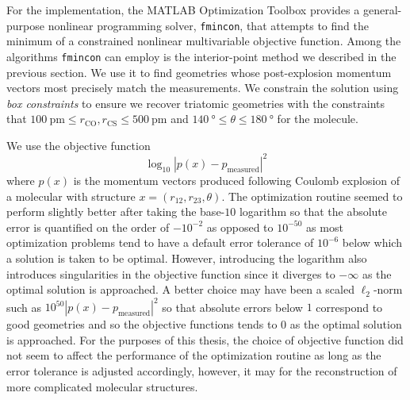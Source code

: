 For the implementation, the MATLAB Optimization Toolbox provides a general-purpose nonlinear programming solver, \texttt{fmincon}, that attempts to find the minimum of a constrained nonlinear multivariable objective function. Among the algorithms \texttt{fmincon} can employ is the interior-point method we described in the previous section. We use it to find geometries whose post-explosion momentum vectors most precisely match the measurements. We constrain the solution using \emph{box constraints} to ensure we recover triatomic geometries with the constraints that $\SI{100}{\pico\meter} \le r_\mathrm{CO}, r_\mathrm{CS} \le \SI{500}{\pico\meter}$ and $\SI{140}{\degree} \le \theta \le \SI{180}{\degree}$ for the  molecule.

We use the objective function
\begin{equation}
\log_{10}|p(x)-p_\textrm{measured}|^2
\end{equation}
where $p(x)$ is the momentum vectors produced following Coulomb explosion of a molecular with structure $x = (r_{12}, r_{23}, \theta)$. The optimization routine seemed to perform slightly better after taking the base-$10$ logarithm so that the absolute error is quantified on the order of $-10^{-2}$ as opposed to $10^{-50}$ as most optimization problems tend to have a default error tolerance of $10^{-6}$ below which a solution is taken to be optimal. However, introducing the logarithm also introduces singularities in the objective function since it diverges to $-\infty$ as the optimal solution is approached. A better choice may have been a scaled $\ell_2$-norm such as $10^{50}|p(x)-p_\textrm{measured}|^2$ so that absolute errors below $1$ correspond to good geometries and so the objective functions tends to $0$ as the optimal solution is approached. For the purposes of this thesis, the choice of objective function did not seem to affect the performance of the optimization routine as long as the error tolerance is adjusted accordingly, however, it may for the reconstruction of more complicated molecular structures.

